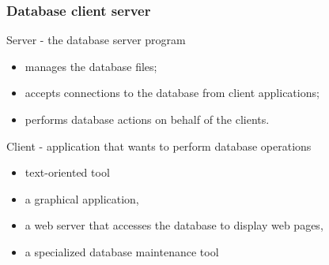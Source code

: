 \begin{frame}[fragile]
        \frametitle{Database client server}
    
    \alert{Server} - the database server program
\begin{itemize}
    \item manages the database files;
    \item accepts connections to the database from client applications;
    \item performs database actions on behalf of the clients.
\end{itemize}
\alert{Client} - application that wants to perform database operations
\begin{itemize}
    \item text-oriented tool
    \item a graphical application,
    \item a web server that accesses the database to display web pages,
    \item a specialized database maintenance tool
\end{itemize}

\end{frame}
